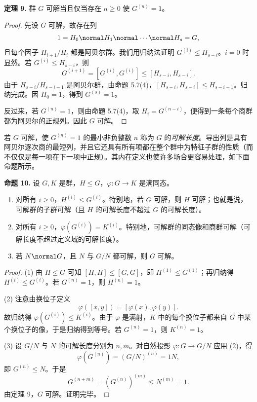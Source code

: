\medskip
\noindent\textbf{定理 9.} 群 $G$ 可解当且仅当存在 $n\geq 0$ 使 $G^{(n)}=1$。

\begin{proof}
先设 $G$ 可解，故存在列
\[
  1=H_0\normal H_1\normal\cdots\normal H_s=G,
\]
且每个因子 $H_{i+1}/H_i$ 都是阿贝尔群。我们用归纳法证明 $G^{(i)}\leq H_{s-i}$。$i=0$ 时显然。若 $G^{(i)}\leq H_{s-i}$，则
\[
  G^{(i+1)}=[G^{(i)},G^{(i)}]\leq [H_{s-i},H_{s-i}].
\]
由于 $H_{s-i}/H_{s-i-1}$ 是阿贝尔群，由命题 5.7(4)，$[H_{s-i},H_{s-i}]\leq H_{s-i-1}$。归纳完成。因 $H_0=1$，得到 $G^{(s)}=1$。

反过来，若 $G^{(n)}=1$，则由命题 5.7(4)，取 $H_i=G^{(n-i)}$，便得到一条每个商群都为阿贝尔的正规列。因此 $G$ 可解。
\end{proof}

若 $G$ 可解，使 $G^{(n)}=1$ 的最小非负整数 $n$ 称为 $G$ 的\emph{可解长度}。导出列是具有阿贝尔逐次商的最短列，并且它还具有所有项都在整个群中为特征子群的性质（而不仅仅是每一项在下一项中正规）。其内在定义也使许多场合更容易处理，如下面命题所示。

\medskip
\noindent\textbf{命题 10.} 设 $G,K$ 是群，$H\leq G$，$\varphi:G\to K$ 是满同态。
\begin{enumerate}[label=(\arabic*)]
  \item 对所有 $i\geq 0$，$H^{(i)}\leq G^{(i)}$。特别地，若 $G$ 可解，则 $H$ 可解；也就是说，可解群的子群可解（且 $H$ 的可解长度不超过 $G$ 的可解长度）。
  \item 对所有 $i\geq 0$，$\varphi(G^{(i)})=K^{(i)}$。特别地，可解群的同态像和商群可解（可解长度不超过定义域的可解长度）。
  \item 若 $N\normal G$，且 $N$ 与 $G/N$ 都可解，则 $G$ 可解。
\end{enumerate}

\begin{proof}
(1) 由 $H\leq G$ 可知 $[H,H]\leq [G,G]$，即 $H^{(1)}\leq G^{(1)}$；再归纳得 $H^{(i)}\leq G^{(i)}$。若 $G^{(n)}=1$，则 $H^{(n)}=1$。

(2) 注意由换位子定义
\[
  \varphi([x,y])=[\varphi(x),\varphi(y)].
\]
故归纳得 $\varphi(G^{(i)})\leq K^{(i)}$。由于 $\varphi$ 是满射，$K$ 中的每个换位子都来自 $G$ 中某个换位子的像，于是归纳得到等号。若 $G^{(n)}=1$，则 $K^{(n)}=1$。

(3) 设 $G/N$ 与 $N$ 的可解长度分别为 $n,m$。对自然投影 $\varphi:G\to G/N$ 应用 (2)，得
\[
  \varphi(G^{(n)})=(G/N)^{(n)}=1N,
\]
即 $G^{(n)}\leq N$。于是
\[
  G^{(n+m)}=(G^{(n)})^{(m)}\leq N^{(m)}=1.
\]
由定理 9，$G$ 可解。证明完毕。
\end{proof}

